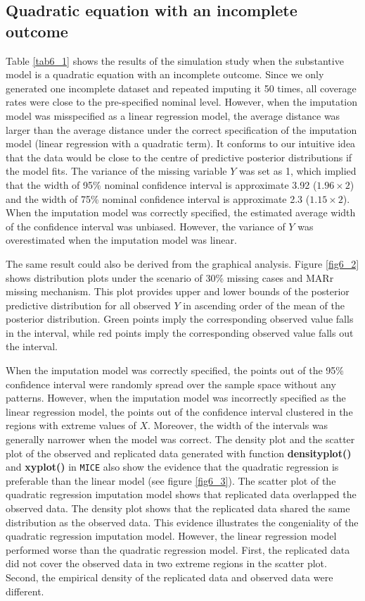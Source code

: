 	\subsection{Quadratic equation with an incomplete outcome}
	Table \ref{tab6_1} shows the results of the simulation study when the substantive model is a quadratic equation with an incomplete outcome. Since we only generated one incomplete dataset and repeated imputing it 50 times, all coverage rates were close to the pre-specified nominal level. However, when the imputation model was misspecified as a linear regression model, the average distance was larger than the average distance under the correct specification of the imputation model (linear regression with a quadratic term). It conforms to our intuitive idea that the data would be close to the centre of predictive posterior distributions if the model fits. The variance of the missing variable $Y$ was set as 1, which implied that the width of 95\% nominal confidence interval is approximate 3.92 ($1.96 \times 2$) and the width of 75\% nominal confidence interval is approximate 2.3 ($1.15 \times 2$). When the imputation model was correctly specified, the estimated average width of the confidence interval was unbiased. However, the variance of $Y$ was overestimated when the imputation model was linear. 
	
	The same result could also be derived from the graphical analysis. Figure \ref{fig6_2} shows distribution plots under the scenario of 30\% missing cases and MARr missing mechanism. This plot provides upper and lower bounds of the posterior predictive distribution for all observed $Y$ in ascending order of the mean of the posterior distribution. Green points imply the corresponding observed value falls in the interval, while red points imply the corresponding observed value falls out the interval. 
	
	When the imputation model was correctly specified, the points out of the 95\% confidence interval were randomly spread over the sample space without any patterns. However, when the imputation model was incorrectly specified as the linear regression model, the points out of the confidence interval clustered in the regions with extreme values of $X$. Moreover, the width of the intervals was generally narrower when the model was correct. The density plot and the scatter plot of the observed and replicated data generated with function \textbf{densityplot()} and \textbf{xyplot()} in \texttt{MICE} also show the evidence that the quadratic regression is preferable than the linear model (see figure \ref{fig6_3}). The scatter plot of the quadratic regression imputation model shows that replicated data overlapped the observed data. The density plot shows that the replicated data shared the same distribution as the observed data. This evidence illustrates the congeniality of the quadratic regression imputation model. However, the linear regression model performed worse than the quadratic regression model. First, the replicated data did not cover the observed data in two extreme regions in the scatter plot. Second, the empirical density of the replicated data and observed data were different. 
	
